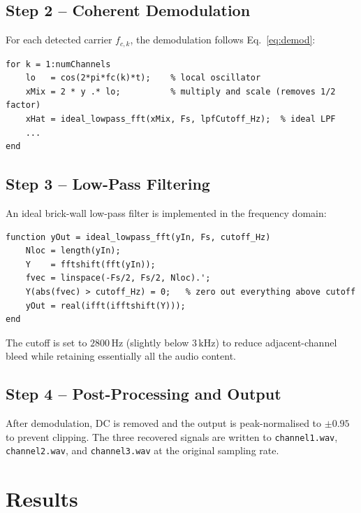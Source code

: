 \documentclass[12pt, a4paper]{article}
\begin{document}
\subsection{Step 2 -- Coherent Demodulation}

For each detected carrier $f_{c,k}$, the demodulation follows
Eq.~\eqref{eq:demod}:

\begin{lstlisting}[caption={Coherent demodulation (excerpt)},label={lst:demod}]
for k = 1:numChannels
    lo   = cos(2*pi*fc(k)*t);    % local oscillator
    xMix = 2 * y .* lo;          % multiply and scale (removes 1/2 factor)
    xHat = ideal_lowpass_fft(xMix, Fs, lpfCutoff_Hz);  % ideal LPF
    ...
end
\end{lstlisting}

\subsection{Step 3 -- Low-Pass Filtering}

An ideal brick-wall low-pass filter is implemented in the frequency domain:

\begin{lstlisting}[caption={Ideal LPF in the frequency domain},label={lst:lpf}]
function yOut = ideal_lowpass_fft(yIn, Fs, cutoff_Hz)
    Nloc = length(yIn);
    Y    = fftshift(fft(yIn));
    fvec = linspace(-Fs/2, Fs/2, Nloc).';
    Y(abs(fvec) > cutoff_Hz) = 0;   % zero out everything above cutoff
    yOut = real(ifft(ifftshift(Y)));
end
\end{lstlisting}

The cutoff is set to $2800\,\text{Hz}$ (slightly below $3\,\text{kHz}$) to
reduce adjacent-channel bleed while retaining essentially all the audio content.

\subsection{Step 4 -- Post-Processing and Output}

After demodulation, DC is removed and the output is peak-normalised to
$\pm 0.95$ to prevent clipping. The three recovered signals are written to
\texttt{channel1.wav}, \texttt{channel2.wav}, and \texttt{channel3.wav} at
the original sampling rate.

\section{Results}
\end{document}
